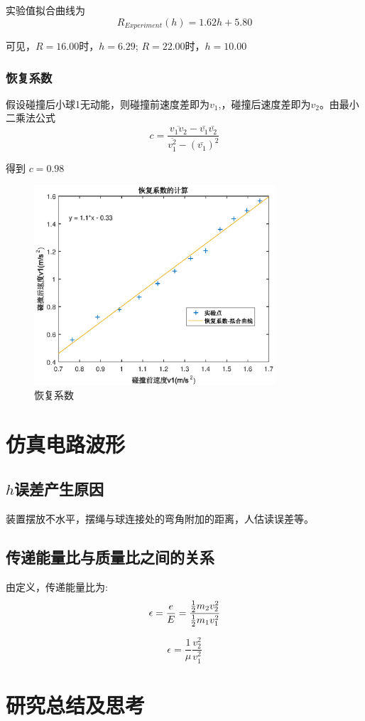 实验值拟合曲线为
\begin{equation}
	R_{Experiment} (h) = 1.62 h + 5.80
\end{equation}

可见，$R = 16.00$时，$h = 6.29$;
$R = 22.00$时，$h = 10.00$


\subsection{恢复系数}

假设碰撞后小球1无动能，则碰撞前速度差即为$v_{1}$,，碰撞后速度差即为$v_{2}$。由最小二乘法公式
\begin{equation}
	c=\frac{\overline{v_{1}v_{2}}-\bar{v_{1}}  \bar{v_{2}}}{\overline{v_{1}^{2}}-(\bar{v_{1}})^{2}}
\end{equation}

得到 $c = 0.98$
\begin{figure}[h]
    \centering
    \includegraphics[width = 0.8\textwidth]{02}
    \caption{恢复系数}
\end{figure}

\chapter{仿真电路波形}
\section{$h$误差产生原因}
	装置摆放不水平，摆绳与球连接处的弯角附加的距离，人估读误差等。

\section{传递能量比与质量比之间的关系}
	由定义，传递能量比为:
\begin{equation}
	\epsilon = \frac{e}{E}\\
			 = \frac{\frac{1}{2}m_{2} v_{2}^{2}}{\frac{1}{2}m_{1} v_{1}^{2}} 
\end{equation}

\begin{equation}
	\epsilon = \frac{1}{\mu} \frac{v_{2}^{2}}{v_{1}^{2}} 
\end{equation}

\chapter{研究总结及思考}



